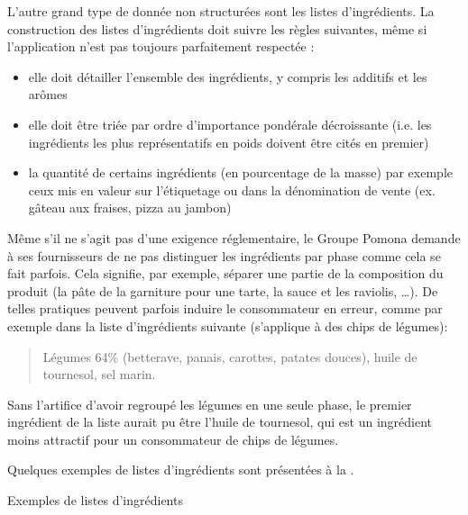             L'autre grand type de donnée non structurées sont les listes d'ingrédients.
            La construction des listes d'ingrédients doit suivre les règles suivantes, même si l'application n'est pas toujours parfaitement respectée :
            \begin{itemize}
                \item elle doit détailler l'ensemble des ingrédients, y compris les additifs et les arômes
                \item elle doit être triée par ordre d'importance pondérale décroissante (i.e. les ingrédients les plus représentatifs en poids doivent être cités en premier)
                \item la quantité de certains ingrédients (en pourcentage de la masse) par exemple ceux mis en valeur sur l'étiquetage ou dans la dénomination de vente (ex. gâteau aux fraises, pizza au jambon)
            \end{itemize}
            Même s'il ne s'agit pas d'une exigence réglementaire, le Groupe Pomona demande à ses fournisseurs de ne pas distinguer les ingrédients par phase comme cela se fait parfois.
            Cela signifie, par exemple, séparer une partie de la composition du produit (la pâte de la garniture pour une tarte, la sauce et les raviolis, \dots).
            De telles pratiques peuvent parfois induire le consommateur en erreur, comme par exemple dans la liste d'ingrédients suivante (s'applique à des chips de légumes):
            \begin{quotation}
                Légumes 64\% (betterave, panais, carottes, patates douces), huile de tournesol, sel marin.
            \end{quotation}
            Sans l'artifice d'avoir regroupé les légumes en une seule phase, le premier ingrédient de la liste aurait pu être l'huile de tournesol, qui est un ingrédient moins attractif pour un consommateur de chips de légumes.

            Quelques exemples de listes d'ingrédients sont présentées à la .

            {\renewcommand{\arraystretch}{2}%
            \begin{table}[htbp]
                {\scriptsize
                \begin{center}%
                \caption{Exemples de listes d'ingrédients}%
                \label{tbl:exemple_ingred}%
                \end{center}%
                }
            \end{table}
            }

